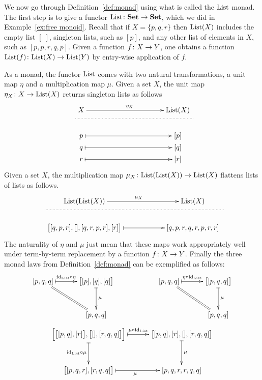 \documentclass[CT4S-EN-RU]{subfiles}
\begin{document}
\begin{exampleENG}\label{ex:monad}
We now go through Definition~\ref{def:monad} using what is called the $\textnormal{List}$ monad. The first step is to give a functor $\textnormal{List}\colon{\mathbf{Set}}\rightarrow{\mathbf{Set}}$, which we did in Example~\ref{ex:free monoid}. Recall that if $X=\{p,q,r\}$ then $\textnormal{List}(X)$ includes the empty list $[\;]$, singleton lists, such as $[p]$, and any other list of elements in $X$, such as $[p,p,r,q,p]$. Given a function $f\colon X\rightarrow Y$, one obtains a function $\textnormal{List}(f)\colon\textnormal{List}(X)\rightarrow\textnormal{List}(Y)$ by entry-wise application of $f$.

As a monad, the functor $\textnormal{List}$ comes with two natural transformations, a unit map $\eta$ and a multiplication map $\mu$. Given a set $X$, the unit map $\eta_X\colon X\rightarrow\textnormal{List}(X)$ returns singleton lists as follows
$$\xymatrix@=.5pt{
&X\ar[rr]^{\eta_X}&\hspace{1.4in}&\List(X)\\
\ar@{..}[rrr]+<.3in,0pt>&&&\\\\\\
&p\ar@{|->}[rr]&&[p]\\
&q\ar@{|->}[rr]&&[q]\\
&r\ar@{|->}[rr]&&[r]}$$
Given a set $X$, the multiplication map $\mu_X\colon\textnormal{List}(\textnormal{List}(X))\rightarrow\textnormal{List}(X)$ flattens lists of lists as follows.
$$\xymatrix@=.5pt{
&\List(\List(X))\ar[rr]^{\mu_X}&\hspace{.7in}&\List(X)\\
\ar@{..}[rrr]+<.6in,0pt>&&&\\\\\\
&\big[[q, p, r], [], [q, r, p, r], [r]\big]\ar@{|->}[rr]&&[q, p, r, q, r, p, r, r]}$$
The naturality of $\eta$ and $\mu$ just mean that these maps work appropriately well under term-by-term replacement by a function $f\colon X\rightarrow Y$. Finally the three monad laws from Definition~\ref{def:monad} can be exemplified as follows:
$$\xymatrix@=30pt{[p, q, q]\ar@{|->}[r]^-{\id_\List\circ\eta}\ar@{=}[rd]&\big[[p], [q], [q]\big]\ar@{|->}[d]^\mu\\&[p, q, q]}\hspace{.8in}
\xymatrix@=30pt{[p, q, q]\ar@{|->}[r]^-{\eta\circ\id_\List}\ar@{=}[rd]&\big[[p, q, q]\big]\ar@{|->}[d]^\mu\\&[p,q,q]}$$
\vspace{.1in}
$$\xymatrix@=30pt{\Big[\big[[p, q], [r]\big], \big[[], [r, q, q]\big]\Big]\ar@{|->}[r]^-{\mu\circ\id_\List}\ar@{|->}[d]_{\id_\List\circ\mu}&\big[[p, q], [r], [], [r, q, q]\big]\ar@{|->}[d]^\mu\\\big[[p, q, r], [r, q, q]\big]\ar@{|->}[r]_\mu&[p, q, r, r, q,q]}$$
\end{exampleENG}
\end{document}
